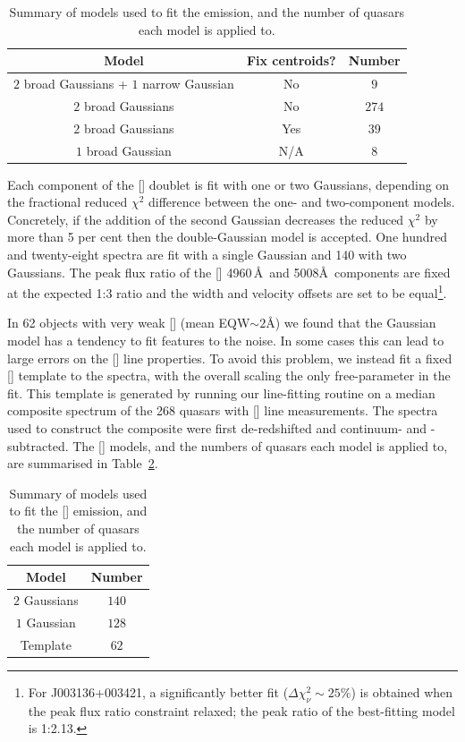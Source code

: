 \begin{table}
  \centering
  \small 
  \caption{Summary of models used to fit the \hb emission, and the number of quasars each model is applied to.}
  \label{tab:hbmod}
    \begin{tabular}{ccc} 
    \hline
    Model & Fix centroids? & Number \\
    \hline
    $2$ broad Gaussians + $1$ narrow Gaussian & No & $9$ \\
    $2$ broad Gaussians & No  &  $274$ \\
    $2$ broad Gaussians & Yes &  $39$ \\
    $1$ broad Gaussian  & N/A &  $8$ \\
    \hline
    \end{tabular}
\end{table} 

Each component of the [] doublet is fit with one or two Gaussians, depending on the fractional reduced $\chi^2$ difference between the one- and two-component models. 
Concretely, if the addition of the second Gaussian decreases the reduced $\chi^2$ by more than 5 per cent then the double-Gaussian model is accepted.
One hundred and twenty-eight spectra are fit with a single Gaussian and 140 with two Gaussians. 
The peak flux ratio of the [] 4960\,\AA\, and 5008\AA\, components are fixed at the expected 1:3 ratio and the width and velocity offsets are set to be equal\footnote{For J003136+003421, a significantly better fit ($\Delta \chi^2_{\nu} \sim 25\%$) is obtained when the peak flux ratio constraint relaxed; the peak ratio of the best-fitting model is 1:2.13.}.

In 62 objects with very weak [] (mean EQW$\sim2$\AA) we found that the Gaussian model has a tendency to fit features to the noise. 
In some cases this can lead to large errors on the [] line properties. 
To avoid this problem, we instead fit a fixed [] template to the spectra, with the overall scaling the only free-parameter in the fit.
This template is generated by running our line-fitting routine on a median composite spectrum of the 268 quasars with [] line measurements.  
The spectra used to construct the composite were first de-redshifted and continuum- and -subtracted.  
The [] models, and the numbers of quasars each model is applied to, are summarised in Table~\ref{tab:oiiimod}.

\begin{table}
  \centering
  \small 
  \caption{Summary of models used to fit the [] emission, and the number of quasars each model is applied to.}
  \label{tab:oiiimod}
    \begin{tabular}{cc} 
    \hline
    Model & Number \\
    \hline
    $2$ Gaussians &  $140$ \\
    $1$ Gaussian  &  $128$ \\
    Template &  $62$ \\
    \hline
    \end{tabular}
\end{table} 

